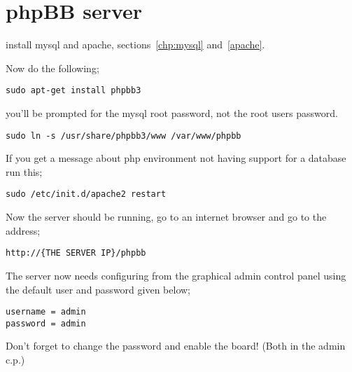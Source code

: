 \chapter{phpBB server}

install mysql and apache, sections~\ref{chp:mysql} and~\ref{apache}.

Now do the following;
\begin{lstlisting}
sudo apt-get install phpbb3
\end{lstlisting}
you'll be prompted for the mysql root password, not the root users password.

\begin{lstlisting}
sudo ln -s /usr/share/phpbb3/www /var/www/phpbb
\end{lstlisting}

If you get a message about php environment not having support for a database run this;
\begin{lstlisting}
sudo /etc/init.d/apache2 restart
\end{lstlisting}

Now the server should be running, go to an internet browser and go to the address;
\begin{lstlisting}
http://{THE SERVER IP}/phpbb
\end{lstlisting}

The server now needs configuring from the graphical admin control panel using the default user and password given below;

\begin{verbatim}
username = admin
password = admin
\end{verbatim}

Don't forget to change the password and enable the board! (Both in the admin c.p.)
